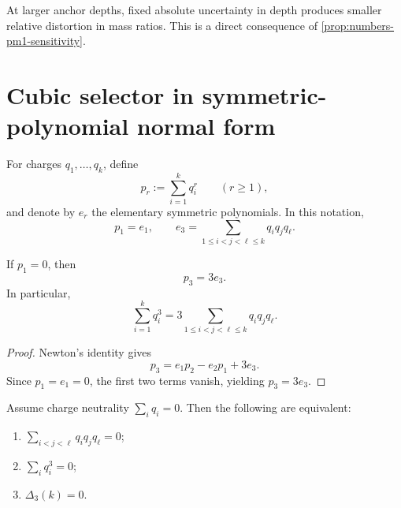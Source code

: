 \begin{remark}
\label{rem:numbers-calibration-implication}
At larger anchor depths, fixed absolute uncertainty in depth produces
smaller relative distortion in mass ratios.
This is a direct consequence of
\cref{prop:numbers-pm1-sensitivity}.
\end{remark}

\section{Cubic selector in symmetric-polynomial normal form}
\label{sec:numbers-cubic-normal-form}

\begin{definition}
\label{def:numbers-power-elementary}
For charges \(q_1,\dots,q_k\), define
\[
  p_r:=\sum_{i=1}^k q_i^r
  \qquad (r\ge1),
\]
and denote by \(e_r\) the elementary symmetric polynomials.
In this notation,
\[
  p_1=e_1,
  \qquad
  e_3=\sum_{1\le i<j<\ell\le k}q_iq_jq_\ell.
\]
\end{definition}

\begin{proposition}
\label{prop:numbers-neutrality-identity}
If \(p_1=0\), then
\[
  p_3=3e_3.
\]
In particular,
\[
  \sum_{i=1}^k q_i^3
  =
  3\sum_{1\le i<j<\ell\le k}q_iq_jq_\ell.
\]
\end{proposition}

\begin{proof}
Newton's identity gives
\[
  p_3=e_1p_2-e_2p_1+3e_3.
\]
Since \(p_1=e_1=0\), the first two terms vanish, yielding
\(p_3=3e_3\).
\end{proof}

\begin{theorem}
\label{thm:numbers-cubic-equivalent-forms}
Assume charge neutrality
\(
  \sum_i q_i=0
\).
Then the following are equivalent:
\begin{enumerate}[label=\textup{(\roman*)}]
\item
      \(\sum_{i<j<\ell}q_iq_jq_\ell=0\);
\item
      \(\sum_i q_i^3=0\);
\item
      \(\Delta_3(k)=0\).
\end{enumerate}
\end{theorem}

